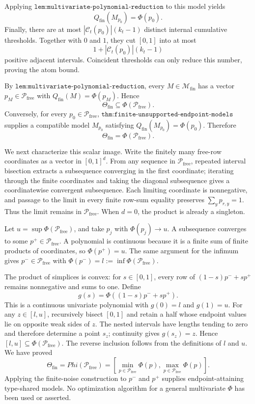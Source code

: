 Applying \(\texttt{lem:multivariate-polynomial-reduction}\) to this model yields
\[
 Q_{\mathrm{fin}}(M_{p_0})=\Phi(p_0).
\]
Finally, there are at most \(|\mathcal C_t(p_0)|(k_t-1)\) distinct internal cumulative thresholds.  Together with \(0\) and \(1\), they cut \([0,1]\) into at most
\[
 1+|\mathcal C_t(p_0)|(k_t-1)
\]
positive adjacent intervals.  Coincident thresholds can only reduce this number, proving the atom bound.

By \(\texttt{lem:multivariate-polynomial-reduction}\), every \(M\in\mathcal M_{\mathrm{fin}}\) has a vector \(p_M\in\mathcal P_{\mathrm{free}}\) with \(Q_{\mathrm{fin}}(M)=\Phi(p_M)\).  Hence
\[
 \Theta_{\mathrm{fin}}\subseteq\Phi(\mathcal P_{\mathrm{free}}).
\]
Conversely, for every \(p_0\in\mathcal P_{\mathrm{free}}\), \(\texttt{thm:finite-unsupported-endpoint-models}\) supplies a compatible model \(M_{p_0}\) satisfying \(Q_{\mathrm{fin}}(M_{p_0})=\Phi(p_0)\).  Therefore
\[
 \Theta_{\mathrm{fin}}=\Phi(\mathcal P_{\mathrm{free}}).
\]

We next characterize this scalar image.  Write the finitely many free-row coordinates as a vector in \([0,1]^d\).  From any sequence in \(\mathcal P_{\mathrm{free}}\), repeated interval bisection extracts a subsequence converging in the first coordinate; iterating through the finite coordinates and taking the diagonal subsequence gives a coordinatewise convergent subsequence.  Each limiting coordinate is nonnegative, and passage to the limit in every finite row-sum equality preserves \(\sum_y p_{r,y}=1\).  Thus the limit remains in \(\mathcal P_{\mathrm{free}}\).  When \(d=0\), the product is already a singleton.

Let \(u=\sup\Phi(\mathcal P_{\mathrm{free}})\), and take \(p_j\) with \(\Phi(p_j)\to u\).  A subsequence converges to some \(p^+\in\mathcal P_{\mathrm{free}}\).  A polynomial is continuous because it is a finite sum of finite products of coordinates, so \(\Phi(p^+)=u\).  The same argument for the infimum gives \(p^-\in\mathcal P_{\mathrm{free}}\) with \(\Phi(p^-)=l:=\inf\Phi(\mathcal P_{\mathrm{free}})\).

The product of simplices is convex: for \(s\in[0,1]\), every row of \((1-s)p^-+sp^+\) remains nonnegative and sums to one.  Define
\[
 g(s)=\Phi((1-s)p^-+sp^+).
\]
This is a continuous univariate polynomial with \(g(0)=l\) and \(g(1)=u\).  For any \(z\in[l,u]\), recursively bisect \([0,1]\) and retain a half whose endpoint values lie on opposite weak sides of \(z\).  The nested intervals have lengths tending to zero and therefore determine a point \(s_z\); continuity gives \(g(s_z)=z\).  Hence \([l,u]\subseteq\Phi(\mathcal P_{\mathrm{free}})\).  The reverse inclusion follows from the definitions of \(l\) and \(u\).  We have proved
\[
 \Theta_{\mathrm{fin}}=Phi(\mathcal P_{\mathrm{free}})
 =\left[\min_{p\in\mathcal P_{\mathrm{free}}}\Phi(p),
         \max_{p\in\mathcal P_{\mathrm{free}}}\Phi(p)\right].
\]
Applying the finite-noise construction to \(p^-\) and \(p^+\) supplies endpoint-attaining type-shared models.  No optimization algorithm for a general multivariate \(\Phi\) has been used or asserted.


